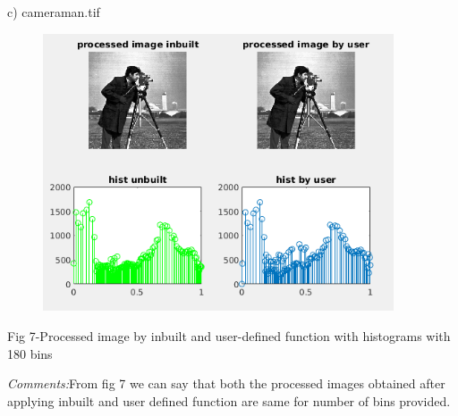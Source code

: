 \documentclass[12pt]{article}
\begin{document}
\vspace{\baselineskip}

\vspace{\baselineskip}
\tab 
\vspace{\baselineskip}\begin{justify}
\tab c) cameraman.tif
\end{justify}\par


\vspace{\baselineskip}



\begin{figure}[H]
	\begin{Center}
		\includegraphics[width=4.08in,height=3.24in]{./media/image16.png}
	\end{Center}
\end{figure}



\tab \tab \par

\begin{adjustwidth}{1.0in}{0.0in}
\begin{Center}
Fig 7-Processed image by inbuilt and user-defined function with histograms with 180 bins
\end{Center}\par

\end{adjustwidth}

\begin{adjustwidth}{1.0in}{0.0in}
\begin{justify}
\textit{Comments:}From fig 7 we can say that both the processed images obtained after applying inbuilt and user defined function are same for number of bins provided.
\end{justify}\par

\end{adjustwidth}
\end{document}
